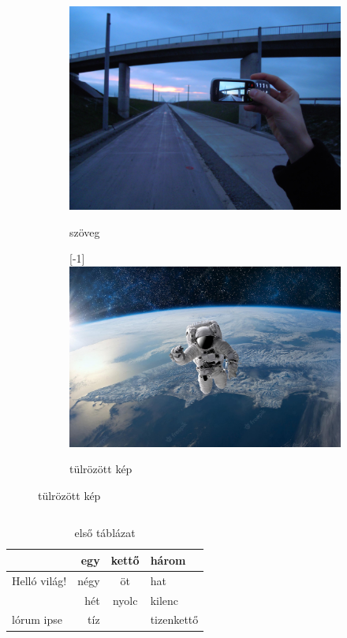 \documentclass{article}
\begin{document}
\begin{figure}[bt]
\centering
\caption{Felirat/Képaláírás}
\hspace{1em} %

\begin{subfigure}{5cm}
\includegraphics[width=.4\linewidth]{image.png}
\label{felirat}
\caption{szöveg}
\end{subfigure}

\begin{subfigure}{5cm}
\scalebox{1}[-1]{\includegraphics[width=.7\linewidth]{image2.jpg}}
\caption{tülrözött kép}
\label{fig:kepek}
\end{subfigure}
\lipsum

\end{figure}

\newpage
\begin{tabular}{r|ll}

\end{tabular}
\clearpage
\listoftables
\newpage

\begin{table}
\begin{tabular}{p{3em}||rcl|}
 & egy & kettő & három \\ \hline \hline
Helló világ! & négy & öt & hat \\ \cline{2-4}
 & hét & nyolc & kilenc \\ \cline{2-2} \cline{4-4}
lórum ipse & tíz & &tizenkettő \\ \hline
\end{tabular}
\caption{első táblázat}
\end{table}
\end{document}
